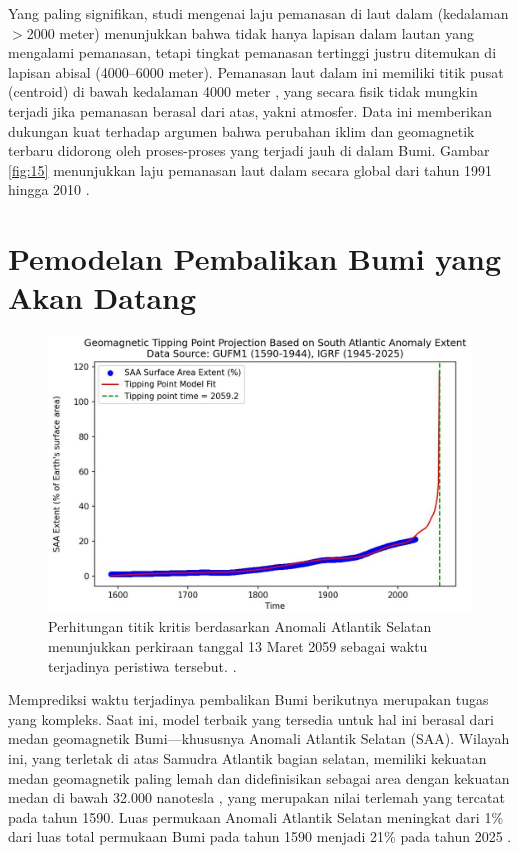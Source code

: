 \documentclass[10pt,twocolumn,letterpaper]{article}
\begin{document}
Yang paling signifikan, studi mengenai laju pemanasan di laut dalam (kedalaman $>$2000 meter) menunjukkan bahwa tidak hanya lapisan dalam lautan yang mengalami pemanasan, tetapi tingkat pemanasan tertinggi justru ditemukan di lapisan abisal (4000–6000 meter). Pemanasan laut dalam ini memiliki titik pusat (centroid) di bawah kedalaman 4000 meter \cite{132,129}, yang secara fisik tidak mungkin terjadi jika pemanasan berasal dari atas, yakni atmosfer. Data ini memberikan dukungan kuat terhadap argumen bahwa perubahan iklim dan geomagnetik terbaru didorong oleh proses-proses yang terjadi jauh di dalam Bumi. Gambar \ref{fig:15} menunjukkan laju pemanasan laut dalam secara global dari tahun 1991 hingga 2010 \cite{132}.

\section{Pemodelan Pembalikan Bumi yang Akan Datang}
\begin{figure}[b]
\begin{center}
   \includegraphics[width=1\linewidth]{saa-crop.jpeg}
\end{center}
   \caption{Perhitungan titik kritis berdasarkan Anomali Atlantik Selatan menunjukkan perkiraan tanggal 13 Maret 2059 sebagai waktu terjadinya peristiwa tersebut. \cite{125,126}.}
\label{fig:16}
\label{fig:onecol}
\end{figure}

Memprediksi waktu terjadinya pembalikan Bumi berikutnya merupakan tugas yang kompleks. Saat ini, model terbaik yang tersedia untuk hal ini berasal dari medan geomagnetik Bumi—khususnya Anomali Atlantik Selatan (SAA). Wilayah ini, yang terletak di atas Samudra Atlantik bagian selatan, memiliki kekuatan medan geomagnetik paling lemah dan didefinisikan sebagai area dengan kekuatan medan di bawah 32.000 nanotesla \cite{135}, yang merupakan nilai terlemah yang tercatat pada tahun 1590. Luas permukaan Anomali Atlantik Selatan meningkat dari 1\% dari luas total permukaan Bumi pada tahun 1590 menjadi 21\% pada tahun 2025 \cite{136}.
\end{document}
